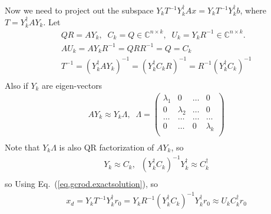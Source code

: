 Now we need to project out the subspace $Y_kT^{-1}Y_k^{\dagger} A x= Y_kT^{-1}Y_k^{\dagger}b$, where $T=Y_k^{\dagger} A Y_k$. Let
\begin{equation}
\begin{split}
&QR=AY_k,\;\;C_k=Q\in \mathbb{C}^{n\times k},\;\;U_k=Y_kR^{-1}\in \mathbb{C}^{n\times k}.\\
&AU_k=AY_kR^{-1}=QRR^{-1}=Q=C_k\\
&T^{-1}=\left(Y_k^{\dagger} A Y_k\right)^{-1}=\left(Y_k^{\dagger} C_k R\right)^{-1}=R^{-1}\left(Y_k^{\dagger} C_k\right)^{-1}\\
\end{split}
\end{equation}
Also if $Y_k$ are eigen-vectors
\begin{equation}
\begin{split}
&AY_k\approx Y_k\Lambda,\;\;\Lambda = \left(\begin{array}{cccc}
\lambda _1 & 0 & \ldots & 0 \\
0 & \lambda _2 & \ldots & 0 \\
\ldots & \ldots & \ldots & \ldots \\
0 & \ldots & 0 & \lambda_k \\
\end{array}\right)\\
\end{split}
\end{equation}
Note that $Y_k\Lambda $ is also QR factorization of $AY_k$, so
\begin{equation}
\begin{split}
&Y_k\approx C_k,\;\;\left(Y_k^{\dagger}C_k\right)^{-1}Y_k^{\dagger}\approx C_k^{\dagger}\\
\end{split}
\end{equation}
so Using Eq.~(\ref{eq.gcrod.exactsolution}), so
\begin{equation}
\begin{split}
&x_d=Y_kT^{-1}Y_k^{\dagger}r_0=Y_kR^{-1}\left(Y_k^{\dagger}C_k\right)^{-1}Y_k^{\dagger}r_0\approx U_kC_k^{\dagger}r_0\\
\end{split}
\label{eq.gcrod.exactsolution2}
\end{equation}

